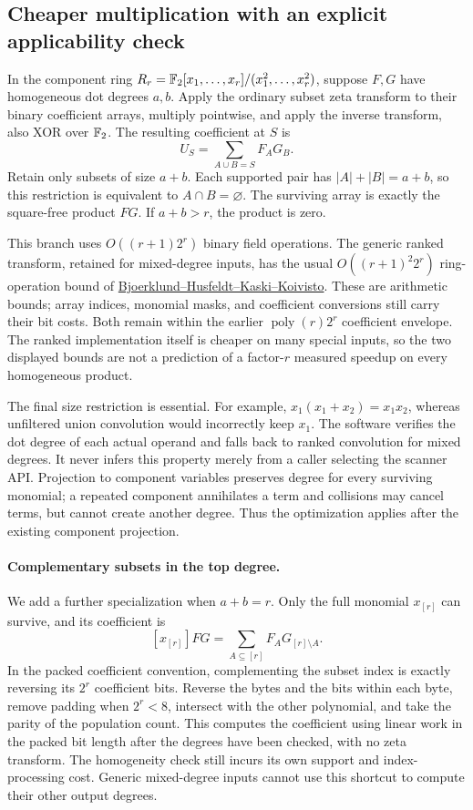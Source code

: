 \subsection{Cheaper multiplication with an explicit applicability check}
In the component ring
$R_r=\mathbb{F}_2[x_1,\ldots,x_r]/(x_1^2,\ldots,x_r^2)$, suppose $F,G$ have
homogeneous dot degrees $a,b$. Apply the ordinary subset zeta
transform to their binary coefficient arrays, multiply pointwise,
and apply the inverse transform, also XOR over $\mathbb{F}_2$. The resulting
coefficient at $S$ is
\[
 U_S=\sum_{A\cup B=S}F_A G_B.
\]
Retain only subsets of size $a+b$. Each supported pair has
$|A|+|B|=a+b$, so this restriction is equivalent to $A\cap B=\varnothing$.
The surviving array is exactly the square-free product $FG$.
If $a+b>r$, the product is zero.

This branch uses $O((r+1)2^r)$ binary field operations. The generic
ranked transform, retained for mixed-degree inputs, has the usual
$O((r+1)^2 2^r)$ ring-operation bound of
\href{https://arxiv.org/abs/cs/0611101v1}{Bjoerklund--Husfeldt--Kaski--Koivisto}.
These are arithmetic bounds; array indices, monomial masks, and
coefficient conversions still carry their bit costs. Both remain
within the earlier $\operatorname{poly}(r)2^r$ coefficient envelope.
The ranked implementation itself is cheaper on many special inputs,
so the two displayed bounds are not a prediction of a factor-$r$
measured speedup on every homogeneous product.

The final size restriction is essential. For example,
$x_1(x_1+x_2)=x_1x_2$, whereas unfiltered union convolution would
incorrectly keep $x_1$. The software verifies the dot degree of each
actual operand and falls back to ranked convolution for mixed degrees.
It never infers this property merely from a caller selecting the
scanner API. Projection to component variables preserves degree for
every surviving monomial; a repeated component annihilates a term
and collisions may cancel terms, but cannot create another degree.
Thus the optimization applies after the existing component projection.

\paragraph{Complementary subsets in the top degree.}
We add a further specialization when $a+b=r$. Only the full monomial
$x_{[r]}$ can survive, and its coefficient is
\[
 [x_{[r]}]FG=\sum_{A\subseteq[r]}F_A G_{[r]\setminus A}.
\]
In the packed coefficient convention, complementing the subset index
is exactly reversing its $2^r$ coefficient bits. Reverse the bytes
and the bits within each byte, remove padding when $2^r<8$, intersect
with the other polynomial, and take the parity of the population
count. This computes the coefficient using linear work in the packed
bit length after the degrees have been checked, with no zeta
transform. The homogeneity check still incurs its own support and
index-processing cost. Generic mixed-degree inputs cannot use this
shortcut to compute their other output degrees.

